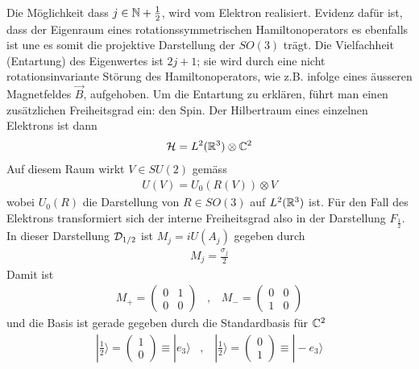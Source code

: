 Die Möglichkeit dass $j \in \mathbb{N} + \frac{1}{2}$, wird vom Elektron realisiert.
Evidenz dafür ist, dass der Eigenraum eines rotationssymmetrischen Hamiltonoperators
es ebenfalls ist une es somit die projektive Darstellung der $SO(3)$ trägt.
Die Vielfachheit (Entartung) des Eigenwertes ist $2j+1$; sie wird durch eine nicht
rotationsinvariante Störung des Hamiltonoperators, wie z.B. infolge eines äusseren
Magnetfeldes $\vec{B}$, aufgehoben.
Um die Entartung zu erklären, führt man einen zusätzlichen Freiheitsgrad ein: den
Spin. Der Hilbertraum eines einzelnen Elektrons ist dann
\begin{align*}
    \mathcal{H} = L^2 (\mathbb{R}^3) \otimes \mathbb{C}^2
\end{align*}
Auf diesem Raum wirkt $V \in SU(2)$ gemäss
\begin{align*}
    U(V) = U_0 (R(V)) \otimes V
\end{align*}
wobei $U_0(R)$ die Darstellung von $R \in SO(3)$ auf $L^2(\mathbb{R}^3)$ ist. Für den Fall
des Elektrons transformiert sich der interne Freiheitsgrad also in der Darstellung
$F_{\frac{1}{2}}$. In dieser Darstellung $\mathcal{D}_{1/2}$ ist $M_j = i U(A_j)$ gegeben
durch
\begin{align*}
    M_j = \frac{\sigma_j}{2}
\end{align*}
Damit ist
\begin{align*}
    M_+ = \begin{pmatrix}
        0 & 1 \\ 0 & 0
    \end{pmatrix}
    \hspace{10pt} , \hspace{10pt}
    M_- = \begin{pmatrix}
        0 & 0 \\ 1 & 0
    \end{pmatrix}
\end{align*}
und die Basis ist gerade gegeben durch die Standardbasis für $\mathbb{C}^2$
\begin{align*}
    | \frac{1}{2} \rangle = \begin{pmatrix}
        1 \\ 0
    \end{pmatrix} \equiv | e_3 \rangle
    \hspace{10pt} , \hspace{10pt}
    | \frac{1}{2} \rangle = \begin{pmatrix}
        0 \\ 1
    \end{pmatrix} \equiv |-e_3 \rangle
\end{align*}
